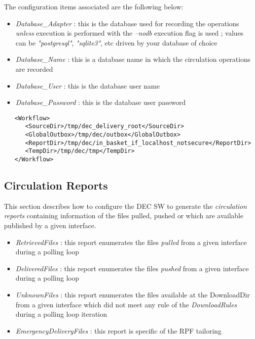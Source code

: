 \documentclass[dec_sum_main.tex]{subfiles}
\begin{document}
\par\noindent
The configuration items associated are the following below:

\begin{itemize}
	\item \textit{Database\_Adapter} : this is the database used for recording the operations \textit{unless} execution is performed with the \textit{--nodb} execution flag is used ; values can be \textit{"postgresql"}, \textit{"sqlite3"}, etc driven by your database of choice 
	\item \textit{Database\_Name} : this is a database name in which the circulation operations are recorded
	\item \textit{Database\_User} : this is the database user name
	\item \textit{Database\_Password} : this is the database user password
\end{itemize}




\begin{verbatim}
   <Workflow>
      <SourceDir>/tmp/dec_delivery_root</SourceDir>
      <GlobalOutbox>/tmp/dec/outbox</GlobalOutbox>
      <ReportDir>/tmp/dec/in_basket_if_localhost_notsecure</ReportDir>
      <TempDir>/tmp/dec/tmp</TempDir>
   </Workflow>
\end{verbatim}


\subsection{Circulation Reports}
This section describes how to configure the DEC SW to generate the \textit{circulation reports} containing information of the files pulled, pushed or which are available published by a given interface.


\begin{itemize}
	\item \textit{RetrievedFiles} : this report enumerates the files \textit{pulled} from a given interface during a polling loop
	\item \textit{DeliveredFiles} : this report enumerates the files \textit{pushed} from a given interface during a polling loop
	\item \textit{UnknownFiles} : this report enumerates the files available at the DownloadDir from a given interface which did not meet any rule of the \textit{DownloadRules} during a polling loop iteration
	\item \textit{EmergencyDeliveryFiles} : this report is specific of the RPF tailoring
\end{itemize}
\end{document}
